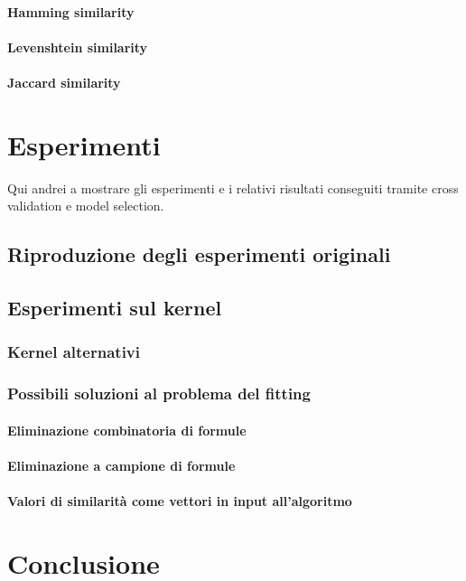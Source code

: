 \documentclass[12pt,a4paper]{report}
\begin{document}
\subsubsection{Hamming similarity}
\subsubsection{Levenshtein similarity}
\subsubsection{Jaccard similarity}

\chapter{Esperimenti}
Qui andrei a mostrare gli esperimenti e i relativi risultati conseguiti tramite cross validation e model selection.
\section{Riproduzione degli esperimenti originali}
\section{Esperimenti sul kernel}
\subsection{Kernel alternativi}
\subsection{Possibili soluzioni al problema del fitting}
\subsubsection{Eliminazione combinatoria di formule}
\subsubsection{Eliminazione a campione di formule}
\subsubsection{Valori di similarità come vettori in input all'algoritmo}

\chapter*{Conclusione}

\end{document}
